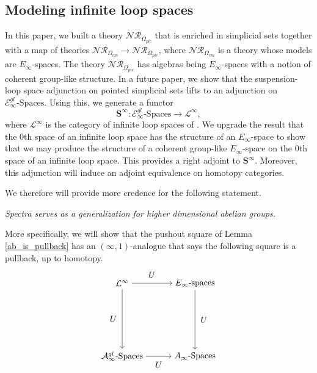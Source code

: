 \documentclass{tac}
\begin{document}
\subsection*{Modeling infinite loop spaces}
In this paper, we built a theory $\mathcal{NR}_{\Omega_{pic}}$ that is enriched in simplicial sets together with a map of theories $\mathcal{NR}_{\Omega_{cm}}\to\mathcal{NR}_{\Omega_{pic}}$, where $\mathcal{NR}_{\Omega_{cm}}$ is a theory whose models are $E_\infty$-spaces. The theory $\mathcal{NR}_{\Omega_{pic}}$ has algebras being $E_\infty$-spaces with a notion of coherent group-like structure. In a future paper, we show that the suspension-loop space adjunction on pointed simplicial sets lifts to an adjunction on $\mathcal{E}^{gl}_{\infty}\text{-Spaces}$. Using this, we generate a functor
\[
\mathbf{S}^\infty:\mathcal{E}^{gl}_{\infty}\text{-Spaces}\to \mathcal{L}^{\infty},
\]
where $\mathcal{L}^\infty$ is the category of infinite loop spaces of \cite{May2}. We upgrade the result that the $0$th space of an infinite loop space has the structure of an $E_\infty$-space to show that we may produce the structure of a coherent group-like $E_\infty$-space on the $0$th space of an infinite loop space. This provides a right adjoint to $\mathbf{S}^\infty$. Moreover, this adjunction will induce an adjoint equivalence on homotopy categories. 

We therefore will provide more credence for the following statement.
\begin{center}
\emph{Spectra serves as a generalization for higher dimensional abelian groups.}
\end{center}
More specifically, we will show that the pushout square of Lemma \ref{ab_is_pullback} has an $(\infty,1)$-analogue that says the following square is a pullback, up to homotopy.
\[
\begin{tikzpicture}[node distance=3cm]
\node (A) {$\mathcal{L}^\infty$};
\node (B)[right of=A] {$E_\infty\text{-spaces}$};
\node (C)[below of=A]{$\mathcal{A}^{gl}_{\infty}\text{-Spaces}$};
\node (D)[right of=C]{$A_\infty\text{-Spaces}$};
\draw[->] (A) to node[above=3] {$U$} (B);
\draw[->] (A) to node[left=3] {$U$} (C);
\draw[->] (B) to node[right=3] {$U$} (D);
\draw[->] (C) to node[below=3] {$U$} (D);
\end{tikzpicture}
\]
\end{document}

